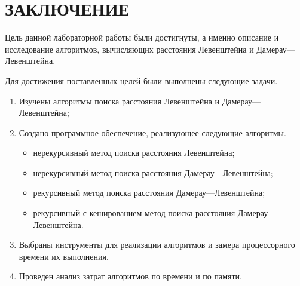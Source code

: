 \chapter*{ЗАКЛЮЧЕНИЕ}

Цель данной лабораторной работы были достигнуты, а именно описание и исследование алгоритмов, вычисляющих расстояния Левенштейна и Дамерау---Левенштейна.

Для достижения поставленных целей были выполнены следующие задачи.
\begin{enumerate}
	\item Изучены алгоритмы поиска расстояния Левенштейна и \newline Дамерау---Левенштейна;
	\item Создано программное обеспечение, реализующее следующие алгоритмы.
	\begin{itemize}
		\item нерекурсивный метод поиска расстояния Левенштейна;
		\item нерекурсивный метод поиска расстояния Дамерау---Левенштейна;
		\item рекурсивный метод поиска расстояния Дамерау---Левенштейна;
		\item рекурсивный с кешированием метод поиска расстояния Дамерау---Левенштейна.
	\end{itemize}
	\item Выбраны инструменты для реализации алгоритмов и замера процессорного времени их выполнения.
	\item Проведен анализ затрат алгоритмов по времени и по памяти. 
\end{enumerate}